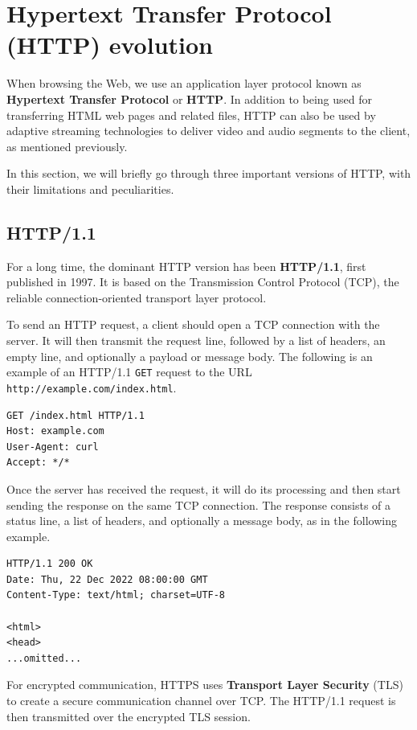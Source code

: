 \section{Hypertext Transfer Protocol (HTTP) evolution}
\label{sec:bg/http}

When browsing the Web, we use an application layer protocol known as \textbf{Hypertext Transfer Protocol} or \textbf{HTTP}. In addition to being used for transferring HTML web pages and related files, HTTP can also be used by adaptive streaming technologies to deliver video and audio segments to the client, as mentioned previously.

In this section, we will briefly go through three important versions of HTTP, with their limitations and peculiarities.

\subsection{HTTP/1.1}
\label{sec:bg/http1}

For a long time, the dominant HTTP version has been \textbf{HTTP/1.1}, first published in 1997.\cite{http1.1} It is based on the Transmission Control Protocol (TCP), the reliable connection-oriented transport layer protocol.

To send an HTTP request, a client should open a TCP connection with the server. It will then transmit the request line, followed by a list of headers, an empty line, and optionally a payload or message body. The following is an example of an HTTP/1.1 \texttt{GET} request to the URL \texttt{http://example.com/index.html}.

\begin{verbatim}
GET /index.html HTTP/1.1
Host: example.com
User-Agent: curl
Accept: */*
\end{verbatim}

Once the server has received the request, it will do its processing and then start sending the response on the same TCP connection. The response consists of a status line, a list of headers, and optionally a message body, as in the following example.

\begin{verbatim}
HTTP/1.1 200 OK
Date: Thu, 22 Dec 2022 08:00:00 GMT
Content-Type: text/html; charset=UTF-8

<html>
<head>
...omitted...
\end{verbatim}

For encrypted communication, HTTPS uses \textbf{Transport Layer Security} (TLS) to create a secure communication channel over TCP. The HTTP/1.1 request is then transmitted over the encrypted TLS session.

